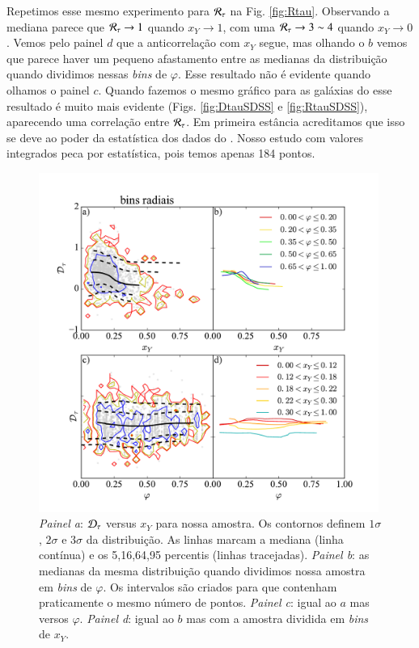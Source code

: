 Repetimos esse mesmo experimento para $\mathcal{R}_\tau$ na Fig. \ref{fig:Rtau}. Observando a mediana parece
que $\mathcal{R}_\tau \to 1$ quando $x_Y \to 1$, com uma $\mathcal{R}_\tau \to 3 \sim 4$ quando $x_Y \to 0$. Vemos pelo
painel $d$ que a anticorrelação com $x_Y$ segue, mas olhando o $b$ vemos que parece haver um pequeno
afastamento entre as medianas da distribuição quando dividimos nessas {\em bins} de $\varphi$. Esse
resultado não é evidente quando olhamos o painel $c$. Quando fazemos o mesmo gráfico para as
galáxias do \SDSS esse resultado é muito mais evidente (Figs. \ref{fig:DtauSDSS} e
\ref{fig:RtauSDSS}), aparecendo uma correlação entre $\mathcal{R}_\tau$. Em primeira estância acreditamos que
isso se deve ao poder da estatística dos dados do \SDSS. Nosso estudo com valores integrados peca
por estatística, pois temos apenas 184 pontos.

\begin{figure}
	\centering
	\includegraphics[width=0.99\textwidth]{figuras/DtauR.pdf}
	\caption[$\Dtau$, $x_Y$ e $\varphi$.]
	{\emph{Painel a}: $\Dtau$ versus $x_Y$ para nossa amostra. Os contornos definem
$1\sigma$, $2\sigma$ e $3\sigma$ da distribuição. As linhas marcam a mediana (linha contínua) e os
5,16,64,95 percentis (linhas tracejadas). \emph{Painel b}: as medianas da mesma distribuição
quando dividimos nossa amostra em {\em bins} de $\varphi$. Os intervalos são criados para que contenham
praticamente o mesmo número de pontos. \emph{Painel c}: igual ao $a$ mas versos
$\varphi$. \emph{Painel d}: igual ao $b$ mas com a amostra dividida em {\em bins} de $x_Y$.}
	\label{fig:Dtau}
\end{figure}

